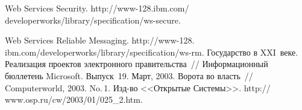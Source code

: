\begin{multicols}{2}
{{\begin{thebibliography}{99}
Web Services Security.
{\sf http://www-128.ibm.com/ developerworks/library/specification/ws-secure}.

Web Services Reliable Messaging.
{\sf http://www-128. ibm.com/developerworks/library/specification/ws-rm}.
Государство в XXI~веке. Реализация проектов электронного правительства~//
Информационный бюллетень Microsoft. Выпуск~19. Март, 2003.
 Ворота во власть~// Computerworld, 2003. No.\,1. Изд-во <<Открытые
Системы>>. {\sf http:// www.osp.ru/cw/2003/01/025\_2.htm}.
\end{thebibliography}

}
}

\end{multicols}

\label{end\stat}